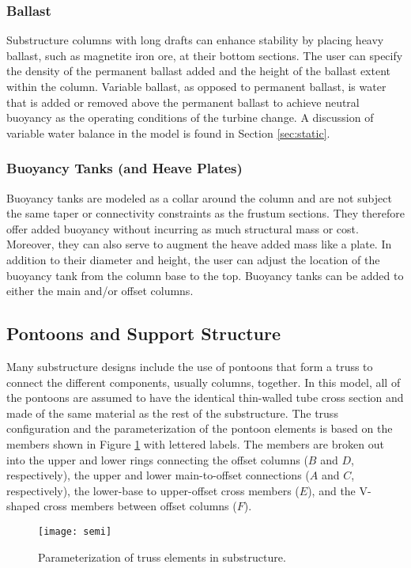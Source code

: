 \subsubsection{Ballast}
Substructure columns with long drafts can enhance stability by placing
heavy ballast, such as magnetite iron ore, at their bottom sections.
The user can specify the density of the permanent ballast added and the
height of the ballast extent within the column.  Variable ballast, as
opposed to permanent ballast, is water that is added or removed above
the permanent ballast to achieve neutral buoyancy as the operating
conditions of the turbine change.  A discussion of variable water
balance in the model is found in Section \ref{sec:static}.

\subsubsection{Buoyancy Tanks (and Heave Plates)}
Buoyancy tanks are modeled as a collar around the column and are not
subject the same taper or connectivity constraints as the frustum
sections.  They therefore offer added buoyancy without incurring as much
structural mass or cost.  Moreover, they can also serve to augment the
heave added mass like a plate.  In addition to their diameter and
height, the user can adjust the location of the buoyancy tank from the
column base to the top. Buoyancy tanks can be added to either the main
and/or offset columns.

\subsection{Pontoons and Support Structure}
Many substructure designs include the use of pontoons that form a truss
to connect the different components, usually columns, together.  In this
model, all of the pontoons are assumed to have the identical thin-walled
tube cross section and made of the same material as the rest of the
substructure.  The truss configuration and the parameterization of the
pontoon elements is based on the members shown in Figure
\ref{fig:pontoon} with lettered labels.  The members are broken out into
the upper and lower rings connecting the offset columns ($B$ and $D$,
respectively), the upper and lower main-to-offset connections ($A$ and
$C$, respectively), the lower-base to upper-offset cross members ($E$),
and the V-shaped cross members between offset columns ($F$).

\begin{figure}[htb]
  \begin{center}
    \texttt{[image: semi]}
    \caption{Parameterization of truss elements in substructure.}
    \label{fig:pontoon}
  \end{center}
\end{figure}


